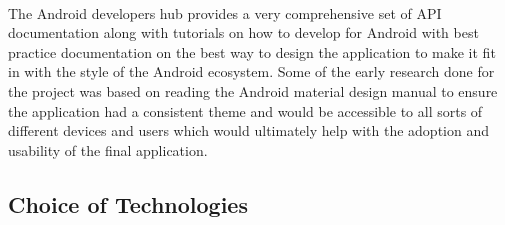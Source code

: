 \\
The Android developers hub provides a very comprehensive set of API documentation along with tutorials on how to develop for Android with best practice documentation on the best way to design the application to make it fit in with the style of the Android ecosystem. Some of the early research done for the project was based on reading the Android material design manual to ensure the application had a consistent theme and would be accessible to all sorts of different devices and users which would ultimately help with the adoption and usability of the final application.

\subsection{Choice of Technologies}
\label{sec:android_choice_of_tech}

